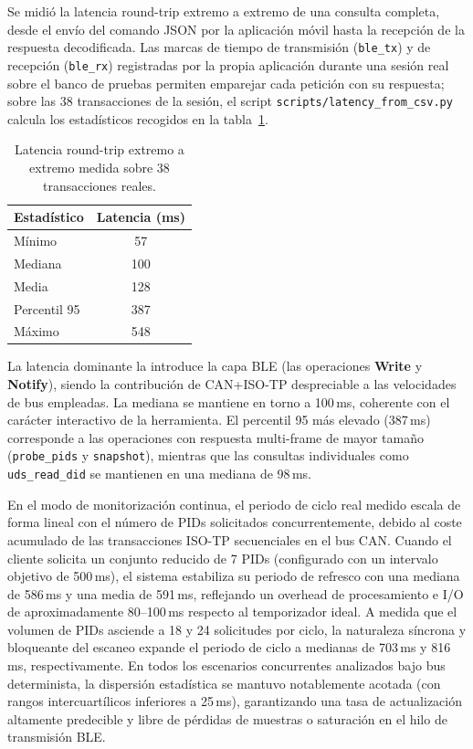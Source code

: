 Se midió la latencia round-trip extremo a extremo de una consulta completa, desde el envío del comando JSON por la aplicación móvil hasta la recepción de la respuesta decodificada. Las marcas de tiempo de transmisión (\texttt{ble\_tx}) y de recepción (\texttt{ble\_rx}) registradas por la propia aplicación durante una sesión real sobre el banco de pruebas permiten emparejar cada petición con su respuesta; sobre las 38 transacciones de la sesión, el script \texttt{scripts/latency\_from\_csv.py} calcula los estadísticos recogidos en la tabla~\ref{tab:latencias}.

\begin{table}[H]
\caption{Latencia round-trip extremo a extremo medida sobre 38 transacciones reales.}
\label{tab:latencias}
\centering
\renewcommand{\arraystretch}{1.2}
\begin{tabular}{|l|c|}
\hline
\textbf{Estadístico} & \textbf{Latencia (ms)} \\
\hline
Mínimo        & 57 \\
Mediana       & 100 \\
Media         & 128 \\
Percentil 95  & 387 \\
Máximo        & 548 \\
\hline
\end{tabular}
\end{table}

La latencia dominante la introduce la capa BLE (las operaciones \textbf{Write} y \textbf{Notify}), siendo la contribución de CAN+ISO-TP despreciable a las velocidades de bus empleadas. La mediana se mantiene en torno a 100\,ms, coherente con el carácter interactivo de la herramienta. El percentil 95 más elevado (387\,ms) corresponde a las operaciones con respuesta multi-frame de mayor tamaño (\texttt{probe\_pids} y \texttt{snapshot}), mientras que las consultas individuales como \texttt{uds\_read\_did} se mantienen en una mediana de 98\,ms.

En el modo de monitorización continua, el periodo de ciclo real medido escala de forma lineal con el número de PIDs solicitados concurrentemente, debido al coste acumulado de las transacciones ISO-TP secuenciales en el bus CAN. Cuando el cliente solicita un conjunto reducido de 7 PIDs (configurado con un intervalo objetivo de 500\,ms), el sistema estabiliza su periodo de refresco con una mediana de 586\,ms y una media de 591\,ms, reflejando un overhead de procesamiento e I/O de aproximadamente 80--100\,ms respecto al temporizador ideal. A medida que el volumen de PIDs asciende a 18 y 24 solicitudes por ciclo, la naturaleza síncrona y bloqueante del escaneo expande el periodo de ciclo a medianas de 703\,ms y 816\,ms, respectivamente. En todos los escenarios concurrentes analizados bajo bus determinista, la dispersión estadística se mantuvo notablemente acotada (con rangos intercuartílicos inferiores a 25\,ms), garantizando una tasa de actualización altamente predecible y libre de pérdidas de muestras o saturación en el hilo de transmisión BLE.

